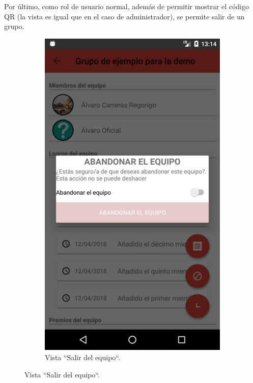 \documentclass[twoside]{report}
\begin{document}
Por último, como rol de usuario normal, además de permitir mostrar el código QR (la vista es igual que en el caso de administrador), se permite salir de un grupo.
\begin{figure}[H]
\begin{center}
	\begin{subfigure}[t]{.3\linewidth}
		\includegraphics[scale=0.2]{images/userguide/21.png}
		\caption{Vista “Salir del equipo“.}
	\end{subfigure}\hspace{5mm}%

\end{center}
\end{figure}
\end{document}
